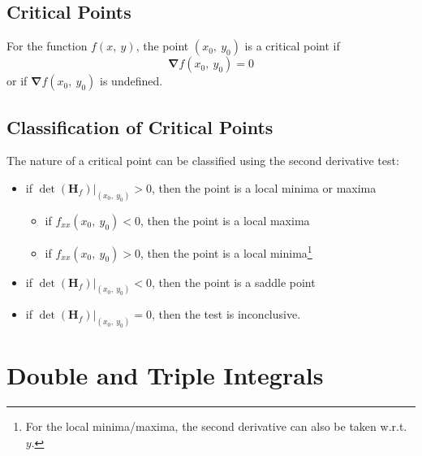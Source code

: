 \documentclass{article}
\begin{document}
\subsection{Critical Points}
For the function \(f(x,\: y)\), the point \((x_0,\: y_0)\) is a critical point if
\begin{equation*}
    \symbf{\nabla}f(x_0,\: y_0) = 0
\end{equation*}
or if \(\symbf{\nabla}f(x_0,\: y_0)\) is undefined.
\subsection{Classification of Critical Points}
The nature of a critical point can be classified using the second derivative test:
\begin{itemize}
    \item if \(\left.\det{\left(\mathbf{H}_f\right)}\right|_{(x_0,\: y_0)} > 0\), then the point is a local minima or maxima
          \begin{itemize}
              \item if \(f_{xx}(x_0, \: y_0) < 0\), then the point is a local maxima
              \item if \(f_{xx}(x_0, \: y_0) > 0\), then the point is a local minima\footnote[1]{For the local minima/maxima, the second derivative can also be taken w.r.t. \(y\).}
          \end{itemize}
    \item if \(\left.\det{\left(\mathbf{H}_f\right)}\right|_{(x_0,\: y_0)} < 0\), then the point is a saddle point
    \item if \(\left.\det{\left(\mathbf{H}_f\right)}\right|_{(x_0,\: y_0)} = 0\), then the test is inconclusive.
\end{itemize}
\newpage
\section{Double and Triple Integrals}
\end{document}
